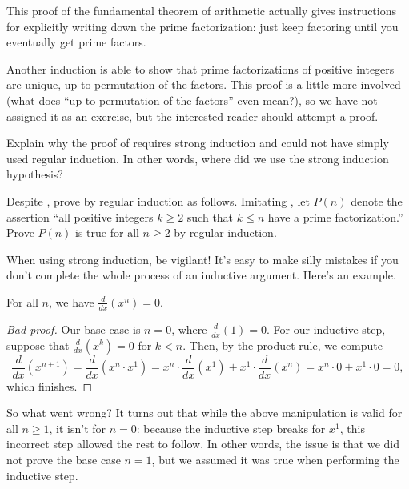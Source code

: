 \documentclass[../main.tex]{subfiles}
\begin{document}
\begin{remark}
    This proof of the fundamental theorem of arithmetic actually gives instructions for explicitly writing down the prime factorization: just keep factoring until you eventually get prime factors. %
\end{remark}
\begin{remark}
    Another induction is able to show that prime factorizations of positive integers are unique, up to permutation of the factors. This proof is a little more involved (what does ``up to permutation of the factors'' even mean?), so we have not assigned it as an exercise, but the interested reader should attempt a proof.
\end{remark}
\begin{exercise} \label{exe:fta-uses-strong-induction}
    Explain why the proof of  requires strong induction and could not have simply used regular induction. In other words, where did we use the strong induction hypothesis?
\end{exercise}
\begin{exe} \label{exe:fta-regular-induction}
    Despite , prove  by regular induction as follows. Imitating , let $P(n)$ denote the assertion ``all positive integers $k\ge2$ such that $k\le n$ have a prime factorization.'' Prove $P(n)$ is true for all $n\ge2$ by regular induction.
\end{exe}
When using strong induction, be vigilant! It's easy to make silly mistakes if you don't complete the whole process of an inductive argument. Here's an example.
\begin{badtheorem}
    For all $n$, we have $\frac{d}{dx}(x^n)=0$.
\end{badtheorem}
\begin{proof}[Bad proof]
    Our base case is $n=0$, where $\frac{d}{dx}(1)=0$. For our inductive step, suppose that $\frac{d}{dx}(x^k)=0$ for $k<n$. Then, by the product rule, we compute
    \[ \frac d{dx}\left(x^{n+1}\right)= \frac d{dx}\left(x^n \cdot x^1\right)=x^n\cdot\frac d{dx}\left(x^1\right)+ x^1\cdot\frac d{dx}\left(x^n\right) =x^n\cdot0+x^1\cdot0=0,\]
    which finishes.
\end{proof}
So what went wrong? It turns out that while the above manipulation is valid for all $n\ge 1$, it isn't for $n=0$: because the inductive step breaks for $x^1$, this incorrect step allowed the rest to follow. In other words, the issue is that we did not prove the base case $n = 1$, but we assumed it was true when performing the inductive step.
\end{document}
